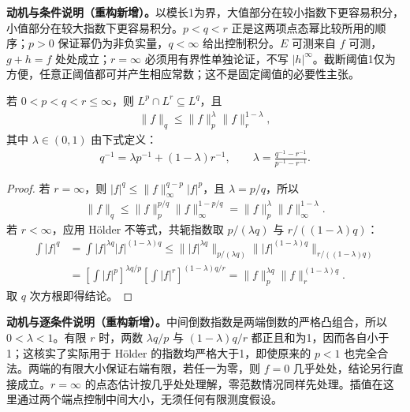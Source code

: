 \documentclass[../../main.tex]{subfiles}
\begin{document}
\begin{remark}
\textbf{动机与条件说明（重构新增）。}以模长1为界，大值部分在较小指数下更容易积分，小值部分在较大指数下更容易积分。$p<q<r$ 正是这两项点态幂比较所用的顺序；$p>0$ 保证幂仍为非负实量，$q<\infty$ 给出控制积分。$E$ 可测来自 $f$ 可测，$g+h=f$ 处处成立；$r=\infty$ 必须用有界性单独论证，不写 $|h|^\infty$。截断阈值1仅为方便，任意正阈值都可并产生相应常数；这不是固定阈值的必要性主张。
\end{remark}
\begin{proposition}\label{proposition:ch06-lp-interpolation}
若 $0<p<q<r\leqslant\infty$，则 $L^p\cap L^r\subseteq L^q$，且
\begin{align*}
\|f\|_q\leqslant\|f\|_p^\lambda\|f\|_r^{1-\lambda},
\end{align*}
其中 $\lambda\in(0,1)$ 由下式定义：
\begin{align*}
q^{-1}=\lambda p^{-1}+(1-\lambda)r^{-1},
\qquad
\lambda=\frac{q^{-1}-r^{-1}}{p^{-1}-r^{-1}}.
\end{align*}
\end{proposition}
\begin{proof}
若 $r=\infty$，则 $|f|^q\leqslant\|f\|_\infty^{q-p}|f|^p$，且 $\lambda=p/q$，所以
\begin{align*}
\|f\|_q\leqslant\|f\|_p^{p/q}\|f\|_\infty^{1-p/q}
=\|f\|_p^\lambda\|f\|_\infty^{1-\lambda}.
\end{align*}
若 $r<\infty$，应用 Hölder 不等式，共轭指数取 $p/(\lambda q)$ 与 $r/((1-\lambda)q)$：
\begin{align*}
\int|f|^q
&=\int|f|^{\lambda q}|f|^{(1-\lambda)q}
\leqslant\bigl\||f|^{\lambda q}\bigr\|_{p/(\lambda q)}
       \bigl\||f|^{(1-\lambda)q}\bigr\|_{r/((1-\lambda)q)}\\
&=\left[\int|f|^p\right]^{\lambda q/p}
  \left[\int|f|^r\right]^{(1-\lambda)q/r}
=\|f\|_p^{\lambda q}\|f\|_r^{(1-\lambda)q}.
\end{align*}
取 $q$ 次方根即得结论。
\end{proof}
\begin{remark}
\textbf{动机与逐条件说明（重构新增）。}中间倒数指数是两端倒数的严格凸组合，所以 $0<\lambda<1$。有限 $r$ 时，两数 $\lambda q/p$ 与 $(1-\lambda)q/r$ 都正且和为1，因而各自小于1；这核实了实际用于 Hölder 的指数均严格大于1，即使原来的 $p<1$ 也完全合法。两端的有限大小保证右端有限，若任一为零，则 $f=0$ 几乎处处，结论另行直接成立。$r=\infty$ 的点态估计按几乎处处理解，零范数情况同样先处理。插值在这里通过两个端点控制中间大小，无须任何有限测度假设。
\end{remark}
\end{document}
